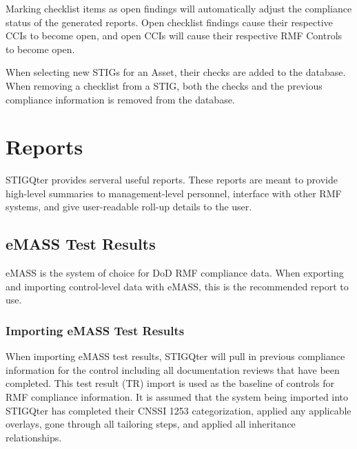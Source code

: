 \documentclass[letterpaper, 10pt, twoside]{article}
\begin{document}
Marking checklist items as open findings will automatically adjust the compliance status of the generated reports. Open checklist findings cause their respective CCIs to become open, and open CCIs will cause their respective RMF Controls to become open.

When selecting new STIGs for an Asset, their checks are added to the database. When removing a checklist from a STIG, both the checks and the previous compliance information is removed from the database.

\section{Reports}

STIGQter provides serveral useful reports. These reports are meant to provide high-level summaries to management-level personnel, interface with other RMF systems, and give user-readable roll-up details to the user.

\subsection{eMASS Test Results}

eMASS is the system of choice for DoD RMF compliance data. When exporting and importing control-level data with eMASS, this is the recommended report to use.

\subsubsection{Importing eMASS Test Results}

When importing eMASS test results, STIGQter will pull in previous compliance information for the control including all documentation reviews that have been completed. This test result (TR) import is used as the baseline of controls for RMF compliance information. It is assumed that the system being imported into STIGQter has completed their CNSSI 1253 categorization, applied any applicable overlays, gone through all tailoring steps, and applied all inheritance relationships.
\end{document}
